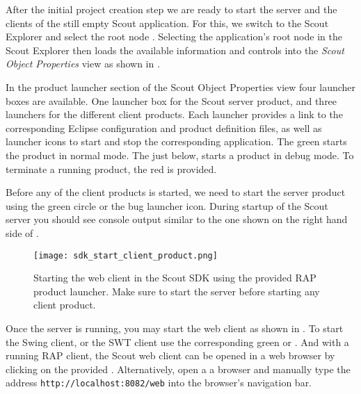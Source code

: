 %

After the initial project creation step we are ready to start the server and the clients of the still empty Scout application.
For this, we switch to the Scout Explorer and select the root node .
Selecting the application's root node in the Scout Explorer then loads the available information and controls into the \textit{Scout Object Properties} view as shown in .

In the product launcher section of the Scout Object Properties view four launcher boxes are available. 
One launcher box for the Scout server product, and three launchers for the different client products.
Each launcher provides a link to the corresponding Eclipse configuration and product definition files, as well as launcher icons to start and stop the corresponding application.
The green  starts the product in normal mode.
The  just below, starts a product in debug mode.
To terminate a running product, the red  is provided. 

Before any of the client products is started, we need to start the server product using the green circle or the bug launcher icon.
During startup of the Scout server you should see console output similar to the one shown on the right hand side of .

\begin{figure}
\texttt{[image: sdk\_start\_client\_product.png]} 
\caption{Starting the web client in the Scout SDK using the provided RAP product launcher. Make sure to start the server before starting any client product.}
\end{figure}

Once the server is running, you may start the web client as shown in .
To start the Swing client, or the SWT client use the corresponding green  or .
And with a running RAP client, the Scout web client can be opened in a web browser by clicking on the provided .
Alternatively, open a a browser and manually type the address \texttt{http://localhost:8082/web} into the browser's navigation bar.

